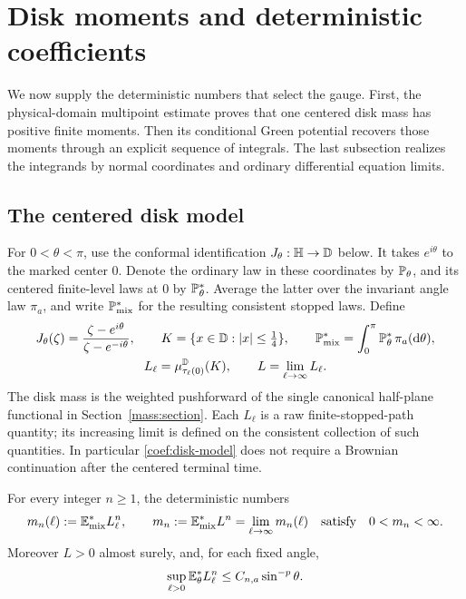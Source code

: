 \section{Disk moments and deterministic coefficients}
\label{coef:section}

We now supply the deterministic numbers that select the gauge. First,
the physical-domain multipoint estimate proves that one centered disk
mass has positive finite moments. Then its conditional Green potential
recovers those moments through an explicit sequence of integrals.
The last subsection realizes the integrands by normal coordinates and
ordinary differential equation limits.

\subsection{The centered disk model}

For $0<\theta<\pi$, use the conformal identification
$J_\theta:\mathbb H\to\mathbb D$ below.  It takes $e^{i\theta}$ to the marked center
$0$.  Denote the ordinary law in these coordinates by $\mathbb P_\theta$, and
its centered finite-level laws at $0$ by $\mathbb P_\theta^*$.
Average the latter over the invariant angle law $\pi_a$, and write
$\mathbb P_{\mathrm{mix}}^*$ for the resulting consistent stopped laws.
Define
\begin{equation}
 \begin{gathered}
 J_\theta(\zeta)=\frac{\zeta-e^{i\theta}}{\zeta-e^{-i\theta}},
 \qquad K=\{x\in\mathbb D:|x|\le\tfrac14\},
 \qquad \mathbb P_{\mathrm{mix}}^*=\int_0^\pi\mathbb P_\theta^*\,\pi_a(\mathop{}\!\mathrm{d}\theta),
 \\
 L_\ell=\mu^{\mathbb D}_{\tau_\ell(0)}(K),
 \qquad L=\lim_{\ell\to\infty}L_\ell.
 \end{gathered}
 \label{coef:disk-model}
\end{equation}
The disk mass is the weighted pushforward of the single canonical
half-plane functional in Section~\ref{mass:section}.
Each $L_\ell$ is a raw finite-stopped-path quantity; its increasing limit
is defined on the consistent collection of such quantities.  In
particular \eqref{coef:disk-model} does not require a Brownian
continuation after the centered terminal time.

\begin{proposition}\label{coef:positive-moments}
For every integer $n\ge1$, the deterministic numbers
\begin{equation}
 m_n(\ell):=\mathbb E_{\mathrm{mix}}^*L_\ell^n,
 \qquad
 m_n:=\mathbb E_{\mathrm{mix}}^*L^n
       =\lim_{\ell\to\infty}m_n(\ell)
       \quad\text{satisfy}\quad 0<m_n<\infty.
 \label{coef:moments}
\end{equation}
Moreover $L>0$ almost surely, and, for each fixed angle,
\begin{equation}
 \sup_{\ell>0}\mathbb E_\theta^*L_\ell^n
                  \le C_{n,a}\sin^{-p}\theta.
 \label{coef:angle-moments}
\end{equation}
\end{proposition}

